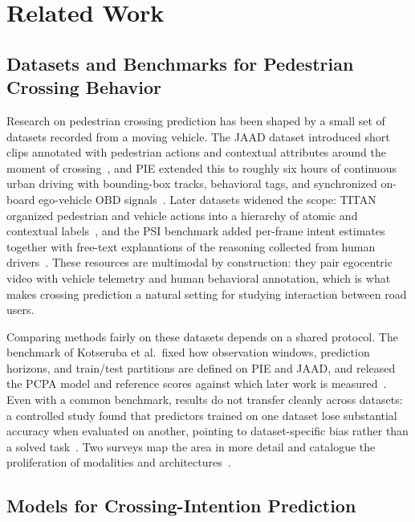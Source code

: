 \documentclass[mti,article,submit,moreauthors]{Definitions/mdpi}
\begin{document}
\section{Related Work}
\label{sec:relatedwork}

\subsection{Datasets and Benchmarks for Pedestrian Crossing Behavior}

Research on pedestrian crossing prediction has been shaped by a small set of datasets recorded from a moving vehicle. The JAAD dataset introduced short clips annotated with pedestrian actions and contextual attributes around the moment of crossing~\citep{rasouli2017jaad}, and PIE extended this to roughly six hours of continuous urban driving with bounding-box tracks, behavioral tags, and synchronized on-board ego-vehicle OBD signals~\citep{rasouli2019pie}. Later datasets widened the scope: TITAN organized pedestrian and vehicle actions into a hierarchy of atomic and contextual labels~\citep{malla2020titan}, and the PSI benchmark added per-frame intent estimates together with free-text explanations of the reasoning collected from human drivers~\citep{chen2021psi}. These resources are multimodal by construction: they pair egocentric video with vehicle telemetry and human behavioral annotation, which is what makes crossing prediction a natural setting for studying interaction between road users.

Comparing methods fairly on these datasets depends on a shared protocol. The benchmark of Kotseruba et al.\ fixed how observation windows, prediction horizons, and train/test partitions are defined on PIE and JAAD, and released the PCPA model and reference scores against which later work is measured~\citep{kotseruba2021benchmark}. Even with a common benchmark, results do not transfer cleanly across datasets: a controlled study found that predictors trained on one dataset lose substantial accuracy when evaluated on another, pointing to dataset-specific bias rather than a solved task~\citep{gesnouin2022assessing}. Two surveys map the area in more detail and catalogue the proliferation of modalities and architectures~\citep{sharma2022survey,rasouli2024diving}.

\subsection{Models for Crossing-Intention Prediction}
\end{document}
